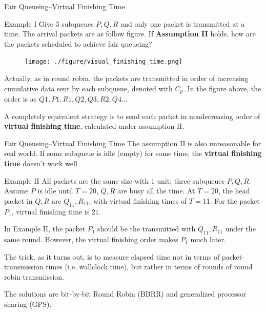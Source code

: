 \documentclass[10pt]{beamer}
\begin{document}
\begin{frame}{Fair Queueing--Virtual Finishing Time}
\begin{exampleblock}{Example I}
Give 3 subqueues $P,Q,R$ and only one packet is transmitted at a time.
The arrival packets are as follow figure.
If \textbf{Assumption II} holds, 
how are the packets scheduled to achieve fair queueing?
\end{exampleblock}
\begin{figure}
\texttt{[image: ./figure/visual\_finishing\_time.png]}
\end{figure}

Actually, as in round robin, the packets are transmitted in order of increasing cumulative data sent by each subqueue, denoted with $C_p$. 
In the figure above, the order is as $Q1,P1,R1,Q2,Q3,R2,Q4\ldots$

A completely equivalent strategy is to send each packet in nondecreasing order of \textbf{virtual finishing time}, calculated under assumption II.
\end{frame}

\begin{frame}{Fair Queueing--Virtual Finishing Time}
The assumption II is also unreasonable for real world. 
If some subqueue is idle (empty) for some time, the \textbf{virtual finishing time} doesn't work well.

\begin{exampleblock}{Example II}
All packets are the same size with 1 unit; three subqueues $P,Q,R$. Assume $P$ is idle until $T = 20$, $Q,R$ are busy all the time. At $T=20$, the head packet in $Q, R$ are $Q_{11}, R_{11}$, with virtual finishing times of $T=11$.
For the packet $P_1$, virtual finishing time is $21$. 
\end{exampleblock}
In Example II, the packet $P_1$ should be the transmitted with $Q_{11}, R_{11}$ under the same round. 
However, the virtual finishing order makes $P_1$ much later. 

The trick, as it turns out, is to measure elapsed time not in terms of packet-transmission times (i.e. wallclock time), but rather in terms of rounds of round robin transmission.

The solutions are bit-by-bit Round Robin (BBRR) and generalized processor sharing (GPS).
\end{frame}
\end{document}
